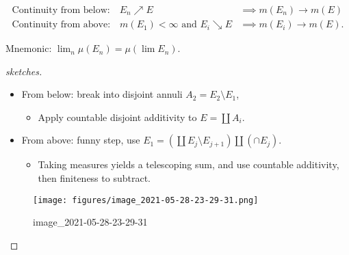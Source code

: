 \begin{proposition}

\begin{align*}
\text{Continuity from below:} \quad 
E_{n} \nearrow E &\implies m(E_{n}) \to m(E) \\
\text{Continuity from above:} \quad 
m(E_{1}) < \infty \text{ and } E_{i} \searrow E &\implies m(E_{i}) \to m(E)
.\end{align*}

Mnemonic: \(\lim_n \mu(E_n) = \mu(\lim E_n)\).

\end{proposition}

\begin{proof}[sketches]

\envlist

\begin{itemize}
\tightlist
\item
  From below: break into disjoint annuli
  \(A_{2} = E_{2}\setminus E_{1}\),

  \begin{itemize}
  \tightlist
  \item
    Apply countable disjoint additivity to
    \(E = {\textstyle\coprod}A_{i}\).
  \end{itemize}
\item
  From above: funny step, use
  \(E_{1} = ({\textstyle\coprod}E_{j}\setminus E_{j+1}) {\textstyle\coprod}(\cap E_{j})\).

  \begin{itemize}
  \tightlist
  \item
    Taking measures yields a telescoping sum, and use countable
    additivity, then finiteness to subtract.
  \end{itemize}
\end{itemize}

\begin{figure}
\centering
\texttt{[image: figures/image\_2021-05-28-23-29-31.png]}
\caption{image\_2021-05-28-23-29-31}
\end{figure}

\end{proof}

